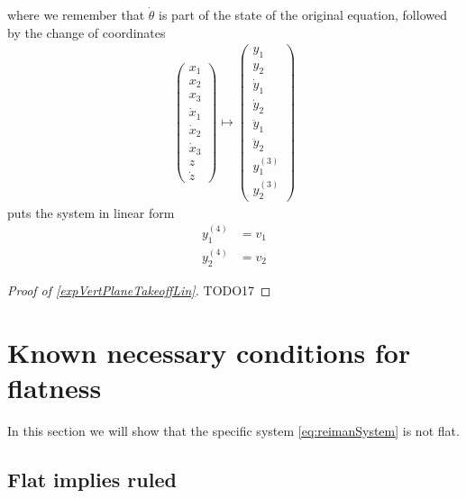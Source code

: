 \documentclass[12pt]{article}
\begin{document}
\begin{example}
  where we remember that $\dot{\theta}$ is part of the state of the original equation, followed by the change of coordinates
  \begin{equation}\begin{aligned}
    \begin{pmatrix}
      x_1 \\ x_2 \\ x_3 \\ \dot{x}_1 \\ \dot{x}_2 \\ \dot{x}_3 \\ z \\ \dot{z}
    \end{pmatrix}
    \mapsto
    \begin{pmatrix}
      y_1 \\ y_2 \\ \dot{y}_1 \\ \dot{y}_2 \\ \ddot{y}_1 \\ \ddot{y}_2 \\ y_1^{(3)} \\ y_2^{(3)}
    \end{pmatrix}
  \end{aligned}\end{equation}
  puts the system in linear form
  \begin{equation}\begin{aligned}
    y_1^{(4)} &= v_1 \\
    y_2^{(4)} &= v_2
  \end{aligned}\end{equation}
\end{example}

\begin{proof}[ Proof of \ref{expVertPlaneTakeoffLin}]
  TODO17
\end{proof}

\section{Known necessary conditions for flatness} \label{necessaryConditionsForFlatness}

In this section we will show that the specific system \eqref{eq:reimanSystem} is
not flat.

\subsection{Flat implies ruled}
\end{document}

